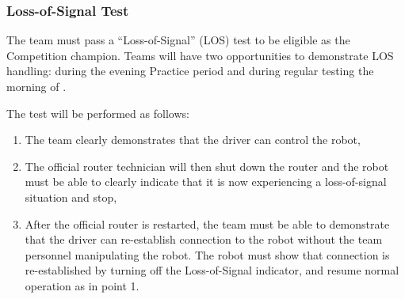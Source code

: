 \subsubsection{Loss-of-Signal Test}
\label{los}
The team must pass a “Loss-of-Signal” (LOS) test to be eligible as the Competition champion. Teams will have two opportunities to demonstrate LOS handling: \textbf{\los} during the evening Practice period and during regular testing the morning of \textbf{\competition}.

The test will be performed as follows:

\begin{enumerate}
\item The team clearly demonstrates that the driver can control the robot,
\item The official router technician will then shut down the router and the robot must be able to clearly indicate that it is now experiencing a loss-of-signal situation and stop,
\item After the official router is restarted, the team must be able to demonstrate that the driver can re-establish connection to the robot without the team personnel manipulating the robot. The robot must show that connection is re-established by turning off the Loss-of-Signal indicator, and resume normal operation as in point 1.
\end{enumerate}